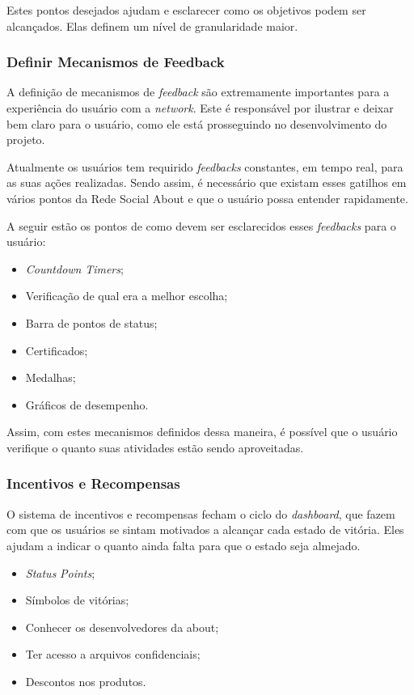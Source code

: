 Estes pontos desejados ajudam e esclarecer como os objetivos podem ser alcançados. Elas 
definem um nível de granularidade maior.

\subsubsection{Definir Mecanismos de Feedback}
\label{sub:define_feedback_mechanics}
A definição de mecanismos de \textit{feedback} são extremamente importantes para a experiência 
do usuário
com a \textit{network}. Este é responsável por ilustrar e deixar bem claro para o usuário, como 
ele está prosseguindo no desenvolvimento do projeto.

Atualmente os usuários tem requirido \textit{feedbacks} constantes, em tempo real, para as suas 
ações
realizadas. Sendo assim, é necessário que existam esses gatilhos em vários pontos da
Rede Social About e que o usuário possa entender rapidamente.

A seguir estão os pontos  de como devem ser esclarecidos esses \textit{feedbacks} para o 
usuário:

\begin{itemize}
    \item \textit{Countdown} \textit{Timers};
    \item Verificação de qual era a melhor escolha;
    \item Barra de pontos de status;
    \item Certificados;
    \item Medalhas;
    \item Gráficos de desempenho.
\end{itemize}

Assim, com estes mecanismos definidos dessa maneira, é possível que o usuário verifique 
o quanto suas atividades estão sendo aproveitadas.

\subsubsection{Incentivos e Recompensas}
\label{sub:incentives_and_rewards}
O sistema de incentivos e recompensas fecham o ciclo do \textit{dashboard}, que fazem com que 
os usuários se sintam motivados a alcançar cada estado de vitória. Eles ajudam a indicar
o quanto ainda falta para que o estado seja almejado.

\begin{itemize}
    \item \textit{Status} \textit{Points};
    \item Símbolos de vitórias;
    \item Conhecer os desenvolvedores da about;
    \item Ter acesso a arquivos confidenciais;
    \item Descontos nos produtos.
\end{itemize}

